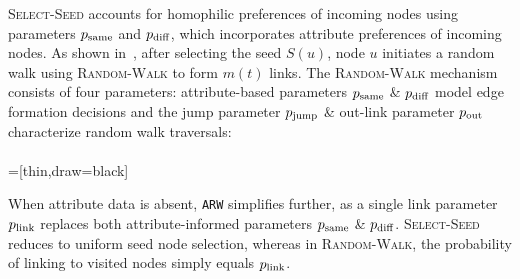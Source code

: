 \textsc{Select-Seed} accounts for homophilic preferences of incoming nodes using
parameters $p_{\scriptsize\mbox{same}}$ and $p_{\scriptsize\mbox{diff}}$, which incorporates attribute preferences of incoming nodes.
As shown in~, after selecting
the seed $S(u)$, node $u$ initiates a
random walk using \textsc{Random-Walk} to form $m(t)$ links.
The \textsc{Random-Walk} mechanism consists of four parameters: attribute-based parameters
$p_{\scriptsize\mbox{same}}$ \& $p_{\scriptsize\mbox{diff}}$ model edge formation decisions and the jump parameter $p_{\scriptsize\mbox{jump}}$ \&
out-link parameter $p_{\scriptsize\mbox{out}}$ characterize random walk traversals:
\\\\
=[thin,draw=black]

When attribute data is absent, \texttt{ARW} simplifies further, as
a single link parameter $p_{\scriptsize\mbox{link}}$ replaces both attribute-informed parameters $p_{\scriptsize\mbox{same}}$ \& $p_{\scriptsize\mbox{diff}}$.
\textsc{Select-Seed} reduces to uniform seed node selection, whereas in
\textsc{Random-Walk}, the probability of linking to visited nodes simply equals $p_{\scriptsize\mbox{link}}$.


